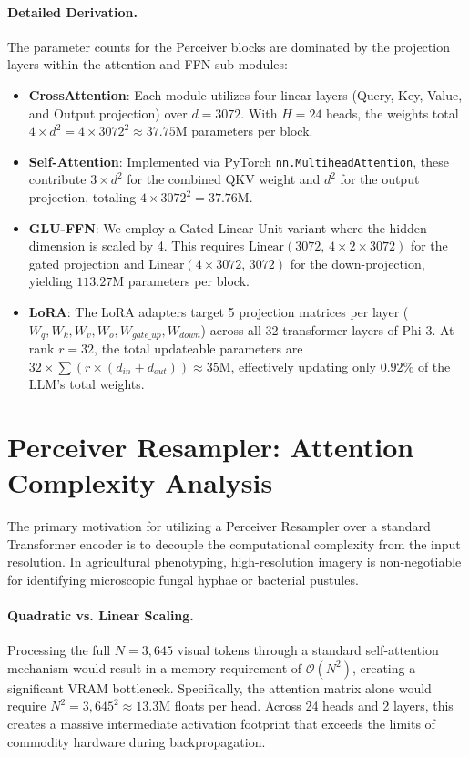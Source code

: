 \documentclass{article}
\begin{document}
\paragraph{Detailed Derivation.}
The parameter counts for the Perceiver blocks are dominated by the projection layers within the attention and FFN sub-modules:
\begin{itemize}[leftmargin=*,noitemsep]
    \item \textbf{CrossAttention}: Each module utilizes four linear layers (Query, Key, Value, and Output projection) over $d{=}3072$. With $H{=}24$ heads, the weights total $4 \times d^2 = 4 \times 3072^2 \approx 37.75$M parameters per block.
    \item \textbf{Self-Attention}: Implemented via PyTorch \texttt{nn.MultiheadAttention}, these contribute $3 \times d^2$ for the combined QKV weight and $d^2$ for the output projection, totaling $4 \times 3072^2 = 37.76$M.
    \item \textbf{GLU-FFN}: We employ a Gated Linear Unit variant where the hidden dimension is scaled by 4. This requires $\text{Linear}(3072,\,4{\times}2{\times}3072)$ for the gated projection and $\text{Linear}(4{\times}3072,\,3072)$ for the down-projection, yielding $113.27$M parameters per block.
    \item \textbf{LoRA}: The LoRA adapters target 5 projection matrices per layer ($W_q, W_k, W_v, W_o, W_{gate\_up}, W_{down}$) across all 32 transformer layers of Phi-3. At rank $r=32$, the total updateable parameters are $32 \times \sum (r \times (d_{in} + d_{out})) \approx 35$M, effectively updating only $0.92\%$ of the LLM's total weights.
\end{itemize}

\section{Perceiver Resampler: Attention Complexity Analysis}
\label{app:complexity}

The primary motivation for utilizing a Perceiver Resampler over a standard Transformer encoder is to decouple the computational complexity from the input resolution. In agricultural phenotyping, high-resolution imagery is non-negotiable for identifying microscopic fungal hyphae or bacterial pustules.

\paragraph{Quadratic vs. Linear Scaling.}
Processing the full $N=3,645$ visual tokens through a standard self-attention mechanism would result in a memory requirement of $\mathcal{O}(N^2)$, creating a significant VRAM bottleneck. Specifically, the attention matrix alone would require $N^2 = 3,645^2 \approx 13.3$M floats per head. Across 24 heads and 2 layers, this creates a massive intermediate activation footprint that exceeds the limits of commodity hardware during backpropagation.
\end{document}
